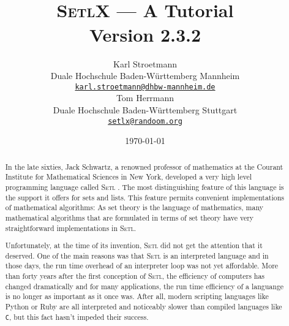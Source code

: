 \documentclass[twoside]{report}
\title{\vspace*{-1cm}
  \epsfig{file=aleph0,scale=0.21} \\[0.5cm]
\textsc{SetlX} --- A Tutorial \\[0.5cm]
Version 2.3.2
}
\author{Karl Stroetmann \\[0.2cm]
Duale Hochschule Baden-W\"urttemberg Mannheim \\[0.2cm]
\href{mailto:karl.stroetmann@dhbw-mannheim.de}{\texttt{karl.stroetmann@dhbw-mannheim.de}} \\[0.5cm]
 Tom Herrmann  \\[0.2cm]
Duale Hochschule Baden-W\"urttemberg Stuttgart \\[0.2cm]
\href{mailto:setlx@randoom.org}{\texttt{setlx@randoom.org}}
}
\date{\today}
\begin{document}
\maketitle

\begin{abstract}
  In the late sixties, Jack Schwartz, a renowned professor of mathematics at the Courant Institute for
Mathematical Sciences in New York, developed a very high level programming language called
\textsc{Setl} 
\cite{schwartz:1970, setl86}.  The most distinguishing feature of this language is the
support it offers for sets and lists.   This feature permits convenient implementations of
mathematical algorithms:  As set theory is the language of mathematics, many mathematical
algorithms that are formulated in terms of set theory have very straightforward implementations in
\textsc{Setl}. 

Unfortunately, at the time of its invention, \textsc{Setl} did not get the attention that it deserved.
One of the main reasons was that \textsc{Setl} is an interpreted language and in those
days, the run time overhead of an interpreter loop was not yet affordable.  More than
forty years after the first conception of \textsc{Setl}, the efficiency of computers has changed
dramatically and for many applications, the run time efficiency of a languange is no
longer as important as it once was.  After all, 
modern scripting languages like Python \cite{vanRossum:95} or Ruby \cite{flanagan:2008}
are all interpreted and noticeably slower than compiled languages like \texttt{C}, but this
fact hasn't impeded their success. 


\end{abstract}
\end{document}
